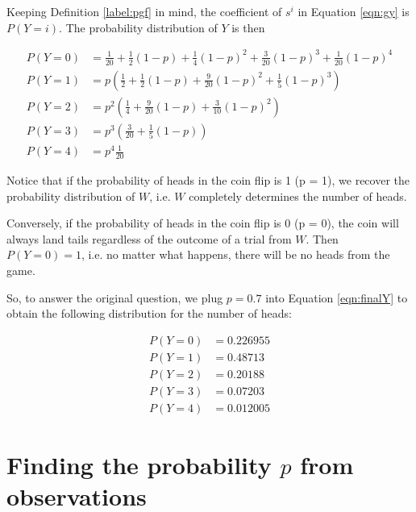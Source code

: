 \documentclass{article}
\begin{document}
\begin{flushleft}
Keeping Definition \ref{label:pgf} in mind, the coefficient of $s^i$ in Equation \ref{eqn:gy} is $P(Y=i)$. The probability distribution of $Y$ is then

\begin{equation} \label{eqn:finalY}
\begin{split}
P(Y = 0) & = \frac{1}{20} + \frac{1}{2}(1-p) + \frac{1}{4}(1-p)^2 + \frac{3}{20}(1-p)^3 + \frac{1}{20}(1-p)^4 \\
P(Y = 1) & = p(\frac{1}{2} + \frac{1}{2}(1-p) + \frac{9}{20}(1-p)^2 + \frac{1}{5}(1-p)^3) \\
P(Y = 2) & = p^2(\frac{1}{4} + \frac{9}{20}(1-p) + \frac{3}{10}(1-p)^2) \\
P(Y = 3) & = p^3(\frac{3}{20} + \frac{1}{5}(1-p)) \\
P(Y = 4) & = p^4 \frac{1}{20}
\end{split}
\end{equation}

Notice that if the probability of heads in the coin flip is 1 (p = 1), we recover the probability distribution of $W$, i.e. $W$ completely determines the number of heads.\newline

Conversely, if the probability of heads in the coin flip is 0 (p = 0), the coin will always land tails regardless of the outcome of a trial from $W$. Then $P(Y=0) = 1$, i.e. no matter what happens, there will be no heads from the game.\newline

So, to answer the original question, we plug $p=0.7$ into Equation \ref{eqn:finalY} to obtain the following distribution for the number of heads:

\begin{equation} \label{dist:finalY}
\begin{split}
P(Y = 0) & = 0.226955\\
P(Y = 1) & = 0.48713\\
P(Y = 2) & = 0.20188\\
P(Y = 3) & = 0.07203\\
P(Y = 4) & = 0.012005
\end{split}
\end{equation}

\end{flushleft}
\section{Finding the probability $p$ from observations} %
\end{document}

